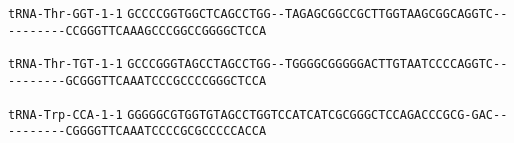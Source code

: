 \documentclass{article}
\newcommand{\rnabox}[1]{\colorbox{#1}{\texttt{#1}}}
\begin{document}
\vspace{-0.5mm}

\texttt{tRNA-Thr-GGT-1-1}
\rnabox{G}\rnabox{C}\rnabox{C}\rnabox{C}\rnabox{C}\rnabox{G}\rnabox{G}\rnabox{T}\rnabox{G}\rnabox{G}\rnabox{C}\rnabox{T}\rnabox{C}\rnabox{A}\rnabox{G}\rnabox{C}\rnabox{C}\rnabox{T}\rnabox{G}\rnabox{G}\rnabox{-}\rnabox{-}\rnabox{T}\rnabox{A}\rnabox{G}\rnabox{A}\rnabox{G}\rnabox{C}\rnabox{G}\rnabox{G}\rnabox{C}\rnabox{C}\rnabox{G}\rnabox{C}\rnabox{T}\rnabox{T}\rnabox{G}\rnabox{G}\rnabox{T}\rnabox{A}\rnabox{A}\rnabox{G}\rnabox{C}\rnabox{G}\rnabox{G}\rnabox{C}\rnabox{A}\rnabox{G}\rnabox{G}\rnabox{T}\rnabox{C}\rnabox{-}\rnabox{-}\rnabox{-}\rnabox{-}\rnabox{-}\rnabox{-}\rnabox{-}\rnabox{-}\rnabox{-}\rnabox{-}\rnabox{C}\rnabox{C}\rnabox{G}\rnabox{G}\rnabox{G}\rnabox{T}\rnabox{T}\rnabox{C}\rnabox{A}\rnabox{A}\rnabox{A}\rnabox{G}\rnabox{C}\rnabox{C}\rnabox{C}\rnabox{G}\rnabox{G}\rnabox{C}\rnabox{C}\rnabox{G}\rnabox{G}\rnabox{G}\rnabox{G}\rnabox{C}\rnabox{T}\rnabox{C}\rnabox{C}\rnabox{A}

\vspace{-0.5mm}

\texttt{tRNA-Thr-TGT-1-1}
\rnabox{G}\rnabox{C}\rnabox{C}\rnabox{C}\rnabox{G}\rnabox{G}\rnabox{G}\rnabox{T}\rnabox{A}\rnabox{G}\rnabox{C}\rnabox{C}\rnabox{T}\rnabox{A}\rnabox{G}\rnabox{C}\rnabox{C}\rnabox{T}\rnabox{G}\rnabox{G}\rnabox{-}\rnabox{-}\rnabox{T}\rnabox{G}\rnabox{G}\rnabox{G}\rnabox{G}\rnabox{C}\rnabox{G}\rnabox{G}\rnabox{G}\rnabox{G}\rnabox{G}\rnabox{A}\rnabox{C}\rnabox{T}\rnabox{T}\rnabox{G}\rnabox{T}\rnabox{A}\rnabox{A}\rnabox{T}\rnabox{C}\rnabox{C}\rnabox{C}\rnabox{C}\rnabox{A}\rnabox{G}\rnabox{G}\rnabox{T}\rnabox{C}\rnabox{-}\rnabox{-}\rnabox{-}\rnabox{-}\rnabox{-}\rnabox{-}\rnabox{-}\rnabox{-}\rnabox{-}\rnabox{-}\rnabox{G}\rnabox{C}\rnabox{G}\rnabox{G}\rnabox{G}\rnabox{T}\rnabox{T}\rnabox{C}\rnabox{A}\rnabox{A}\rnabox{A}\rnabox{T}\rnabox{C}\rnabox{C}\rnabox{C}\rnabox{G}\rnabox{C}\rnabox{C}\rnabox{C}\rnabox{C}\rnabox{G}\rnabox{G}\rnabox{G}\rnabox{C}\rnabox{T}\rnabox{C}\rnabox{C}\rnabox{A}

\vspace{-0.5mm}

\texttt{tRNA-Trp-CCA-1-1}
\rnabox{G}\rnabox{G}\rnabox{G}\rnabox{G}\rnabox{G}\rnabox{C}\rnabox{G}\rnabox{T}\rnabox{G}\rnabox{G}\rnabox{T}\rnabox{G}\rnabox{T}\rnabox{A}\rnabox{G}\rnabox{C}\rnabox{C}\rnabox{T}\rnabox{G}\rnabox{G}\rnabox{T}\rnabox{C}\rnabox{C}\rnabox{A}\rnabox{T}\rnabox{C}\rnabox{A}\rnabox{T}\rnabox{C}\rnabox{G}\rnabox{C}\rnabox{G}\rnabox{G}\rnabox{G}\rnabox{C}\rnabox{T}\rnabox{C}\rnabox{C}\rnabox{A}\rnabox{G}\rnabox{A}\rnabox{C}\rnabox{C}\rnabox{C}\rnabox{G}\rnabox{C}\rnabox{G}\rnabox{-}\rnabox{G}\rnabox{A}\rnabox{C}\rnabox{-}\rnabox{-}\rnabox{-}\rnabox{-}\rnabox{-}\rnabox{-}\rnabox{-}\rnabox{-}\rnabox{-}\rnabox{-}\rnabox{C}\rnabox{G}\rnabox{G}\rnabox{G}\rnabox{G}\rnabox{T}\rnabox{T}\rnabox{C}\rnabox{A}\rnabox{A}\rnabox{A}\rnabox{T}\rnabox{C}\rnabox{C}\rnabox{C}\rnabox{C}\rnabox{G}\rnabox{C}\rnabox{G}\rnabox{C}\rnabox{C}\rnabox{C}\rnabox{C}\rnabox{C}\rnabox{A}\rnabox{C}\rnabox{C}\rnabox{A}
\end{document}

